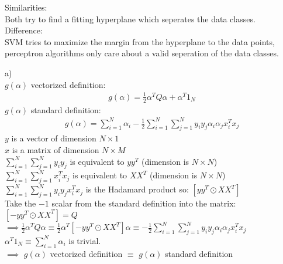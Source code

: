 %
%
%
\begin{flushleft}
Similarities: \\
Both try to find a fitting hyperplane which seperates the data classes.\\
Difference: \\
SVM tries to maximize the margin from the hyperplane to the data points, perceptron algorithms only care about a valid seperation of the data classes.
\end{flushleft}
%
%
%
\begin{flushleft}
a)\\
$g(\alpha)$ vectorized definition:
\begin{align*}
g(\alpha) = \frac{1}{2}\alpha^{T}Q\alpha + \alpha^{T}1_{N}
\end{align*}
$g(\alpha)$ standard definition:
\begin{align*}
g(\alpha) = \sum_{i=1}^{N}\alpha_{i}-\frac{1}{2}\sum_{i=1}^{N}\sum_{j=1}^{N}
y_{i}y_{j}\alpha_{i}\alpha_{j}x^{T}_{i}x_{j}
\end{align*}
$y$ is a vector of dimension $N\times 1$\\
$x$ is a matrix of dimension $N\times M$\\
$\sum_{i=1}^{N}\sum_{j=1}^{N}y_{i}y_{j}$ is equivalent to $yy^{T}$ 
(dimension is $N\times N$)\\
$\sum_{i=1}^{N}\sum_{j=1}^{N}x^{T}_{i}x_{j}$ is equivalent to $XX^{T}$ 
(dimension is $N\times N$)\\
$\sum_{i=1}^{N}\sum_{j=1}^{N}y_{i}y_{j}x^{T}_{i}x_{j}$ is the Hadamard product so:
$[yy^{T} \odot XX^{T}]$\\
Take the $-1$ scalar from the standard definition into the matrix: 
$[-yy^{T} \odot XX^{T}] = Q$\\
$\implies \frac{1}{2}\alpha^{T}Q\alpha \equiv \frac{1}{2}\alpha^{T}[-yy^{T} 
\odot XX^{T}]\alpha \equiv -\frac{1}{2}\sum_{i=1}^{N}\sum_{j=1}^{N}y_{i}y_{j}\alpha_{i}
\alpha_{j}x^{T}_{i}x_{j}$\\
$\alpha^{T}1_{N} \equiv \sum_{i=1}^{N}\alpha_{i}$ is trivial.\\
$\implies$ $g(\alpha)$ vectorized definition $\equiv$ $g(\alpha)$ standard definition
\end{flushleft}
